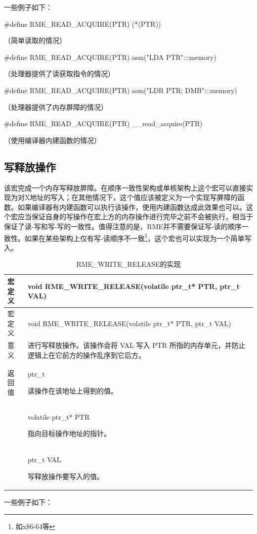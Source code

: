 一些例子如下：

\#define RME\_READ\_ACQUIRE(PTR) (*(PTR))

（简单读取的情况）

\#define RME\_READ\_ACQUIRE(PTR) asm("LDA PTR":::memory)

（处理器提供了读获取指令的情况）

\#define RME\_READ\_ACQUIRE(PTR) asm("LDR PTR; DMB":::memory)

（处理器提供了内存屏障的情况）

\#define RME\_READ\_ACQUIRE(PTR) \_\_read\_acquire(PTR)

（使用编译器内建函数的情况）

\subsection{写释放操作}\label{subsec:7-write-release-operation}

该宏完成一个内存写释放屏障。在顺序一致性架构或单核架构上这个宏可以直接实现为对X地址的写入；在其他情况下，这个值应该被定义为一个实现写屏障的函数。如果编译器有内建函数可以执行该操作，使用内建函数达成此效果也可以。这个宏应当保证自身的写操作在宏上方的内存操作进行完毕之前不会被执行，相当于保证了读-写和写-写的一致性。值得注意的是，RME并不需要保证写-读的顺序一致性。如果在某些架构上仅有写-读顺序不一致\footnote{如x86-64等}，这个宏也可以实现为一个简单写入。

\begin{xltabular}{\textwidth}{@{}>{\hsize\raggedright\arraybackslash}X>{\hsize\raggedright\arraybackslash}X@{}}
\caption{RME\_WRITE\_RELEASE的实现}\label{tab:7-30-rme-write-release-implementation}\\
\toprule
宏定义 & void RME\_WRITE\_RELEASE(volatile ptr\_t* PTR, ptr\_t
VAL)\tabularnewline
\endfirsthead
\toprule
宏定义 & void RME\_WRITE\_RELEASE(volatile ptr\_t* PTR, ptr\_t
VAL)\tabularnewline
\midrule
\endhead
\bottomrule
\endlastfoot
意义 &
进行写释放操作。该操作会将 VAL 写入 PTR 所指的内存单元，并防止逻辑上在它前方的操作乱序到它后方。\tabularnewline
返回值\strut
 & ptr\_t

读操作在该地址上得到的值。\strut
\tabularnewline
{} & volatile ptr\_t* PTR

指向目标操作地址的指针。\strut
\tabularnewline
\strut
 & ptr\_t VAL

写释放操作要写入的值。\strut
\tabularnewline
\end{xltabular}

一些例子如下：

